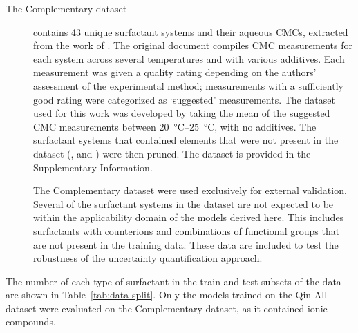 \begin{description}
    \item[The Complementary dataset]
          contains 43 unique surfactant systems and their aqueous CMCs,
          extracted from the work of
          \citet{mukerjeeCriticalMicelleConcentrations1971}. The original
          document compiles CMC measurements for each system across several
          temperatures and with various additives. Each measurement was given a
          quality rating depending on the authors' assessment of the
          experimental method; measurements with a sufficiently good rating were
          categorized as `suggested' measurements. The dataset used for this
          work was developed by taking the mean of the suggested CMC
          measurements between \SIrange{20}{25}{\degreeCelsius}, with no
          additives. The surfactant systems that contained elements that were
          not present in the dataset (,  and ) were then
          pruned. The dataset is provided in the Supplementary Information.

          The Complementary dataset were used exclusively for external validation. Several
          of the surfactant systems in the dataset are not expected to be within
          the applicability domain of the models derived here. This includes
          surfactants with counterions and combinations of functional groups
          that are not present in the training data. These data are included to
          test the robustness of the uncertainty quantification approach.
\end{description}

The number of each type of surfactant in the train and test subsets of the data are shown in Table~\ref{tab:data-split}. Only the models trained on the Qin-All dataset were evaluated on the Complementary dataset, as it contained ionic compounds.

